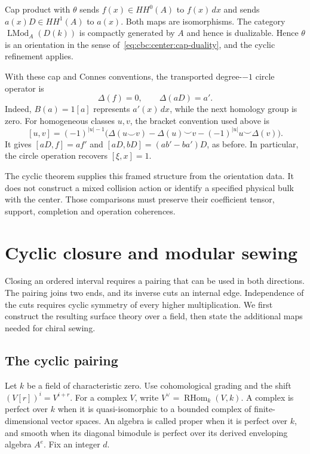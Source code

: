 Cap product with $\theta$ sends $f(x)\in HH^0(A)$ to $f(x)\,dx$ and sends $a(x)D\in HH^1(A)$ to $a(x)$.
Both maps are isomorphisms.
The category $\operatorname{LMod}_A(D(k))$ is compactly generated by $A$ and hence is dualizable.
Hence $\theta$ is an orientation in the sense of~\eqref{eq:cbc:center:cap-duality}, and the cyclic refinement applies.

With these cap and Connes conventions, the transported degree-$-1$ circle operator is
\[
 \Delta(f)=0,\qquad \Delta(aD)=a'.
\]
Indeed, $B(a)=1[a]$ represents $a'(x)\,dx$, while the next homology group is zero.
For homogeneous classes $u,v$, the bracket convention used above is
\[
 [u,v]=(-1)^{|u|-1}
 \bigl(\Delta(u\smile v)-\Delta(u)\smile v
             -(-1)^{|u|}u\smile\Delta(v)\bigr).
\]
It gives $[aD,f]=af'$ and $[aD,bD]=(ab'-ba')D$, as before.
In particular, the circle operation recovers $[\xi,x]=1$.

The cyclic theorem supplies this framed structure from the orientation data.
It does not construct a mixed collision action or identify a specified physical bulk with the center.
Those comparisons must preserve their coefficient tensor, support, completion and operation coherences.

\chapter{Cyclic closure and modular sewing}\label{chap:cbc:cyclic-sewing}
Closing an ordered interval requires a pairing that can be used in both directions.
The pairing joins two ends, and its inverse cuts an internal edge.
Independence of the cuts requires cyclic symmetry of every higher multiplication.
We first construct the resulting surface theory over a field, then state the additional maps needed for chiral sewing.

\section{The cyclic pairing}

Let $k$ be a field of characteristic zero.
Use cohomological grading and the shift $(V[r])^i=V^{i+r}$.
For a complex $V$, write $V^\vee=\operatorname{RHom}_k(V,k)$.
A complex is perfect over $k$ when it is quasi-isomorphic to a bounded complex of finite-dimensional vector spaces.
An algebra is called proper when it is perfect over $k$, and smooth when its diagonal bimodule is perfect over its derived enveloping algebra $A^e$.
Fix an integer $d$.

